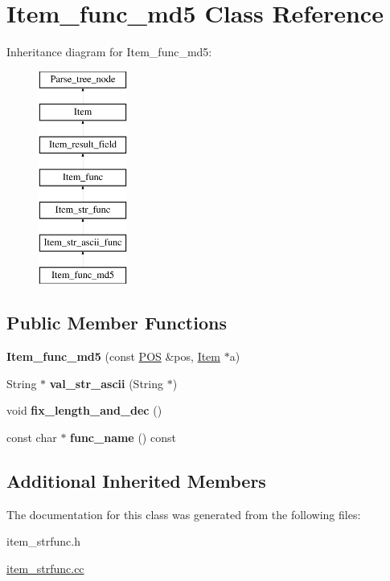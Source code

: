 \hypertarget{classItem__func__md5}{}\section{Item\+\_\+func\+\_\+md5 Class Reference}
\label{classItem__func__md5}
Inheritance diagram for Item\+\_\+func\+\_\+md5\+:\begin{figure}[H]
\begin{center}
\leavevmode
\includegraphics[height=7.000000cm]{classItem__func__md5}
\end{center}
\end{figure}
\subsection*{Public Member Functions}
\begin{DoxyCompactItemize}
\item 
\mbox{\label{classItem__func__md5_a0e16823b7713f1aca4a5815141d9124e}} 
{\bfseries Item\+\_\+func\+\_\+md5} (const \mbox{\hyperlink{structYYLTYPE}{P\+OS}} \&pos, \mbox{\hyperlink{classItem}{Item}} $\ast$a)
\item 
\mbox{\label{classItem__func__md5_a4a9dffc0744cdf3c48d3839a6ace28fa}} 
String $\ast$ {\bfseries val\+\_\+str\+\_\+ascii} (String $\ast$)
\item 
\mbox{\label{classItem__func__md5_ab80093128029cf3d17d221bb4c47661c}} 
void {\bfseries fix\+\_\+length\+\_\+and\+\_\+dec} ()
\item 
\mbox{\label{classItem__func__md5_aa9c9ff09879a81431656f8a799f9a82f}} 
const char $\ast$ {\bfseries func\+\_\+name} () const
\end{DoxyCompactItemize}
\subsection*{Additional Inherited Members}


The documentation for this class was generated from the following files\+:\begin{DoxyCompactItemize}
\item 
item\+\_\+strfunc.\+h\item 
\mbox{\hyperlink{item__strfunc_8cc}{item\+\_\+strfunc.\+cc}}\end{DoxyCompactItemize}
